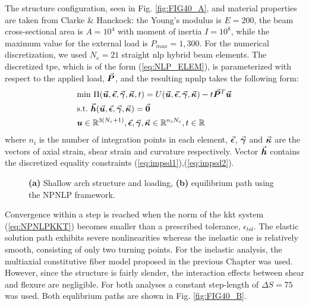 The structure configuration, seen in Fig. \ref{fig:FIG40_A}, and material 
properties are 
taken from Clarke \& Hanckock\cite{Clarke:1990}: the Young's modulus is 
$E=200$, the beam cross-sectional area is $A= 10^4$ with moment of inertia 
$I=10^8$, while the maximum value for the external load is $P_{max}=1,300$.
For the numerical discretization, we used $N_e=21$ straight \acrshort{nlp} 
hybrid beam elements. The discretized \acrshort{tpe}, which is of the 
form (\ref{eq:NLP_ELEM}), is parameterized with respect to the applied load, 
$\vec{\bm{P}}$, and the resulting \acrshort{npnlp} takes the following form:
\begin{align}
	&\text{min}\
	\Pi(\bvec{u},\bvec{\epsilon},\bvec{\gamma},\bvec{\kappa},t)=U(\bvec{u},\bvec{\epsilon},
	\bvec{\gamma},\bvec{\kappa})-t\bvec{P}^T\bvec{u}\label{eq:PiEX4}\\
	&\text{s.t.}\ 
	\bvec{h}(\bvec{u},\bvec{\epsilon},\bvec{\gamma},\bvec{\kappa})=\bvec{0}\nonumber\\
	&\bm{u}\in\mathbb{R}^{3(N_e+1)},
	\bvec{\epsilon},\bvec{\gamma},\bvec{\kappa}\in\mathbb{R}^{n_iN_e},
	t\in\mathbb{R}\nonumber
\end{align}
\nonumber where $n_i$ is the number of integration points in each element,
$\vec{\bm{\epsilon}}$, $\vec{\bm{\gamma}}$ and $\vec{\bm{\kappa}}$ are the vectors of axial 
strain,
shear strain and curvature respectively. Vector $\vec{\bm{h}}$ contains the 
discretized equality constraints (\ref{eq:impsd1}),(\ref{eq:impsd2}).

\begin{figure*}[t]
	\centering
	\qquad
	\caption{\textbf{(a)} Shallow arch structure and loading, \textbf{(b)}
		equilibrium path using the NPNLP framework.}%
	\label{fig:FIG40}%
\end{figure*}

Convergence within 
a step is reached when the norm of the \acrshort{kkt} system 
(\ref{eq:NPNLPKKT}) becomes smaller than a prescribed tolerance, 
$\epsilon_{tol}$. The elastic solution path exhibits severe nonlinearities 
whereas the inelastic one is relatively smooth, consisting of only two turning 
points. For the inelastic analysis, the multiaxial constitutive fiber 
model proposed in the previous Chapter was used. However, since the structure 
is fairly slender, the interaction effects between shear and flexure are 
negligible. For both analyses a constant step-length of $\Delta S= 75$ was 
used. Both equlibrium paths are shown in Fig. \ref{fig:FIG40_B}.

